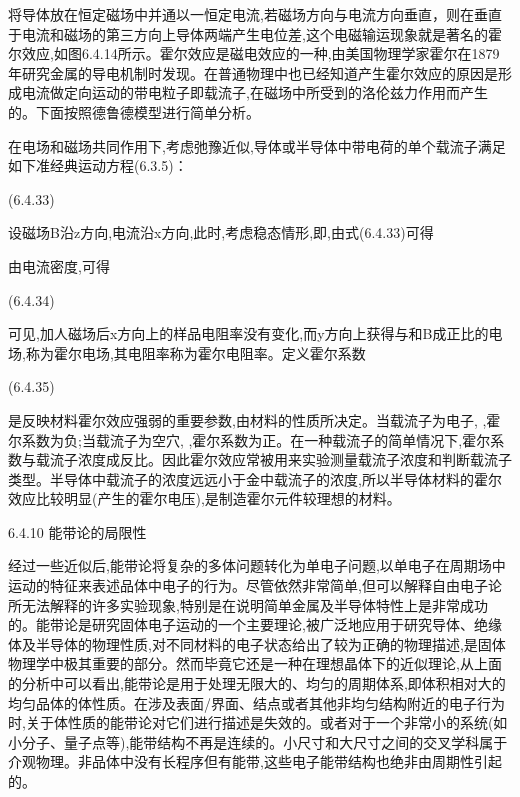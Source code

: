 将导体放在恒定磁场中并通以一恒定电流,若磁场方向与电流方向垂直，则在垂直于电流和磁场的第三方向上导体两端产生电位差,这个电磁输运现象就是著名的霍尔效应,如图6.4.14所示。霍尔效应是磁电效应的一种,由美国物理学家霍尔在1879年研究金属的导电机制时发现。在普通物理中也已经知道产生霍尔效应的原因是形成电流做定向运动的带电粒子即载流子,在磁场中所受到的洛伦兹力作用而产生的。下面按照德鲁德模型进行简单分析。

在电场和磁场共同作用下,考虑弛豫近似,导体或半导体中带电荷的单个载流子满足如下准经典运动方程(6.3.5)：

 	(6.4.33)

设磁场B沿z方向,电流沿x方向,此时,考虑稳态情形,即,由式(6.4.33)可得



由电流密度,可得

 	(6.4.34)

可见,加人磁场后x方向上的样品电阻率没有变化,而y方向上获得与和B成正比的电场,称为霍尔电场,其电阻率称为霍尔电阻率。定义霍尔系数

	 (6.4.35)

是反映材料霍尔效应强弱的重要参数,由材料的性质所决定。当载流子为电子, ,霍尔系数为负;当载流子为空穴, ,霍尔系数为正。在一种载流子的简单情况下,霍尔系数与载流子浓度成反比。因此霍尔效应常被用来实验测量载流子浓度和判断载流子类型。半导体中载流子的浓度远远小于金中载流子的浓度,所以半导体材料的霍尔效应比较明显(产生的霍尔电压),是制造霍尔元件较理想的材料。



6.4.10 能带论的局限性

经过一些近似后,能带论将复杂的多体问题转化为单电子问题,以单电子在周期场中运动的特征来表述品体中电子的行为。尽管依然非常简单,但可以解释自由电子论所无法解释的许多实验现象,特别是在说明简单金属及半导体特性上是非常成功的。能带论是研究固体电子运动的一个主要理论,被广泛地应用于研究导体、绝缘体及半导体的物理性质,对不同材料的电子状态给出了较为正确的物理描述,是固体物理学中极其重要的部分。然而毕竟它还是一种在理想晶体下的近似理论,从上面的分析中可以看出,能带论是用于处理无限大的、均匀的周期体系,即体积相对大的均匀品体的体性质。在涉及表面/界面、结点或者其他非均匀结构附近的电子行为时,关于体性质的能带论对它们进行描述是失效的。或者对于一个非常小的系统(如小分子、量子点等),能带结构不再是连续的。小尺寸和大尺寸之间的交叉学科属于介观物理。非品体中没有长程序但有能带,这些电子能带结构也绝非由周期性引起的。

